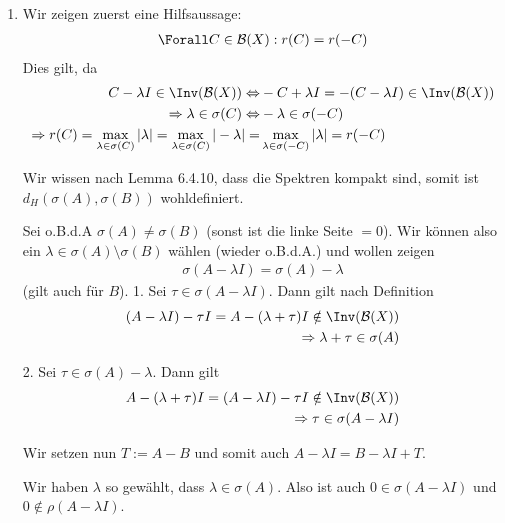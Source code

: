 \begin{solution}
\begin{enumerate}[label = (\alph*)]

\item
Wir zeigen zuerst eine Hilfsaussage:
\begin{align}\label{Lemmachen}
  \Forall C \in \mathcal{B}(X): r(C) = r(-C)
\end{align}
Dies gilt, da
\begin{align*}
  C - \lambda I \in \Inv(\mathcal{B}(X)) \Leftrightarrow & -C + \lambda I = -(C - \lambda I) \in \Inv(\mathcal{B}(X)) \\
  \Rightarrow \lambda \in \sigma (C) \Leftrightarrow & -\lambda \in \sigma (-C) \\
  \Rightarrow r(C) = \max_{\lambda \in \sigma (C)} |\lambda| = \max_{\lambda \in \sigma (C)} |-\lambda| = & \max_{\lambda \in \sigma (-C)} |\lambda| = r(-C)
\end{align*}

Wir wissen nach Lemma 6.4.10, dass die Spektren kompakt sind, somit ist $d_H(\sigma(A), \sigma(B))$ wohldefiniert.

Sei o.B.d.A $\sigma(A) \neq \sigma(B)$ (sonst ist die linke Seite $=0$). Wir können also ein $\lambda \in \sigma(A) \setminus \sigma(B)$ wählen (wieder o.B.d.A.) und wollen zeigen
\begin{align}\label{minuslambda}
  \sigma(A-\lambda I) = \sigma(A) - \lambda
\end{align}
(gilt auch für $B$).
1. Sei $\tau \in \sigma(A-\lambda I)$. Dann gilt nach Definition
\begin{align*}
  (A-\lambda I) - \tau I = A - (\lambda + \tau) I \notin \Inv(\mathcal{B}(X)) \\
  \Rightarrow \lambda + \tau \in \sigma(A)
\end{align*}

2. Sei $\tau \in \sigma(A) - \lambda$. Dann gilt
\begin{align*}
  A - (\lambda + \tau) I = (A - \lambda I) -\tau I \notin \Inv(\mathcal{B}(X)) \\
  \Rightarrow \tau \in \sigma(A - \lambda I)
\end{align*}

Wir setzen nun $T := A - B$ und somit auch $A- \lambda I = B - \lambda I + T$.

Wir haben $\lambda$ so gewählt, dass $\lambda \in \sigma(A)$. Also ist auch $0 \in \sigma(A - \lambda I)$ und $0 \notin \rho(A - \lambda I)$.


\end{enumerate}
\end{solution}
